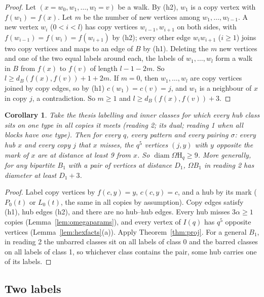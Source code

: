 \documentclass[11pt]{amsart}
\newtheorem{corollary}[theorem]{Corollary}
\theoremstyle{definition}
\theoremstyle{remark}
\numberwithin{equation}{section}
\newcommand{\diam}{\operatorname{diam}}
\newcommand{\Om}{\Omega\mathrm H}
\begin{document}
\begin{proof}
Let $(x=w_0,w_1,\dots,w_l=v)$ be a walk. By (h2), $w_1$ is a copy vertex with $f(w_1)=f(x)$. Let $m$ be the number of new
vertices among $w_1,\dots,w_{l-1}$. A new vertex $w_i$ ($0<i<l$) has copy vertices $w_{i-1},w_{i+1}$ on both sides, with
$f(w_{i-1})=f(w_i)=f(w_{i+1})$ by (h2); every other edge $w_iw_{i+1}$ ($i\ge1$) joins two copy vertices and maps to an edge of
$B$ by (h1). Deleting the $m$ new vertices and one of the two equal labels around each, the labels of $w_1,\dots,w_l$ form a
walk in $B$ from $f(x)$ to $f(v)$ of length $l-1-2m$. So $l\ge d_B(f(x),f(v))+1+2m$. If $m=0$, then $w_1,\dots,w_l$ are copy
vertices joined by copy edges, so by (h1) $c(w_1)=c(v)=j$, and $w_1$ is a neighbour of $x$ in copy $j$, a contradiction. So
$m\ge1$ and $l\ge d_B(f(x),f(v))+3$.
\end{proof}

\begin{corollary}\label{cor:proj}
Take the thesis labelling and inner classes for which every hub class sits on one type in all copies it meets (reading 2;
its dual; reading 1 when all blocks have one type). Then for every $q$, every pattern and every pairing $\sigma$: every hub
$x$ and every copy $j$ that $x$ misses, the $q^5$ vertices $(j,y)$ with $y$ opposite the mark of $x$ are at distance at
least 9 from $x$. So $\diam\Om_q\ge9$. More generally, for any bipartite $B_1$ with a pair of vertices at distance $D_1$,
$\Omega B_1$ in reading 2 has diameter at least $D_1+3$.
\end{corollary}

\begin{proof}
Label copy vertices by $f(c,y)=y$, $c(c,y)=c$, and a hub by its mark ($P_0(t)$ or $L_0(t)$, the same in all copies by
assumption). Copy edges satisfy (h1), hub edges (h2), and there are no hub--hub edges. Every hub misses $3\alpha\ge1$ copies
(Lemma~\ref{lem:omegaparams}), and every vertex of $I(q)$ has $q^5$ opposite vertices (Lemma~\ref{lem:hexfacts}(a)). Apply
Theorem~\ref{thm:proj}. For a general $B_1$, in reading 2 the unbarred classes sit on all labels of class 0 and the barred
classes on all labels of class 1, so whichever class contains the pair, some hub carries one of its labels.
\end{proof}

\subsection{Two labels}
\end{document}
